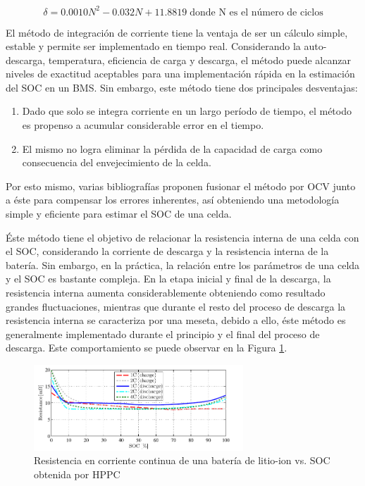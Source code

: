 \documentclass[10pt,a4paper]{article}
\newcounter{subsubsubsection}[subsubsection]
\begin{document}
\begin{equation}
    \delta = 0.0010N^2 - 0.032N + 11.8819\label{batt_cap_correction}\;
    \text{donde N es el n\'umero de ciclos}
\end{equation}

\noindent El m\'etodo de integraci\'on de corriente tiene la ventaja de ser un
c\'alculo simple, estable y permite ser implementado en tiempo real.
Considerando la auto-descarga, temperatura, eficiencia de carga y descarga, el
m\'etodo puede alcanzar niveles de exactitud aceptables para una
implementaci\'on r\'apida en la estimaci\'on del \acrshort{SOC} en un BMS. Sin
embargo, este m\'etodo tiene dos principales desventajas:

\begin{enumerate}
    \item Dado que solo se integra corriente en un largo per\'iodo de tiempo, el
        m\'etodo es propenso a acumular considerable error en el tiempo.
    \item El mismo no logra eliminar la p\'erdida de la capacidad de carga como
        consecuencia del envejecimiento de la celda.
\end{enumerate}

\noindent Por esto mismo, varias bibliograf\'ias proponen fusionar el m\'etodo
por \acrshort{OCV} junto a \'este para compensar los errores inherentes, as\'i
obteniendo una metodolog\'ia simple y eficiente para estimar el \acrshort{SOC}
de una celda.

\label{internalRMethod}

\noindent \'Este m\'etodo tiene el objetivo de relacionar la resistencia interna
de una celda con el \acrshort{SOC}, considerando la corriente de descarga y la
resistencia interna de la bater\'ia. Sin embargo, en la pr\'actica, la
relaci\'on entre los par\'ametros de una celda y el \acrshort{SOC} es bastante
compleja. En la etapa inicial y final de la descarga, la resistencia interna
aumenta considerablemente obteniendo como resultado grandes fluctuaciones,
mientras que durante el resto del proceso de descarga la resistencia interna se
caracteriza por una meseta, debido a ello, \'este m\'etodo es generalmente
implementado durante el principio y el final del proceso de descarga. Este 
comportamiento se puede observar en la Figura \ref{res_int_graph}.

\begin{figure}[h]
    \begin{center}
	\includegraphics[width=0.7\textwidth]{Ro_vs_SOC.png}
	\caption{Resistencia en corriente continua de una batería de litio-ion vs. 
        SOC obtenida por HPPC}
	\label{res_int_graph}
    \end{center}
\end{figure}
\end{document}
